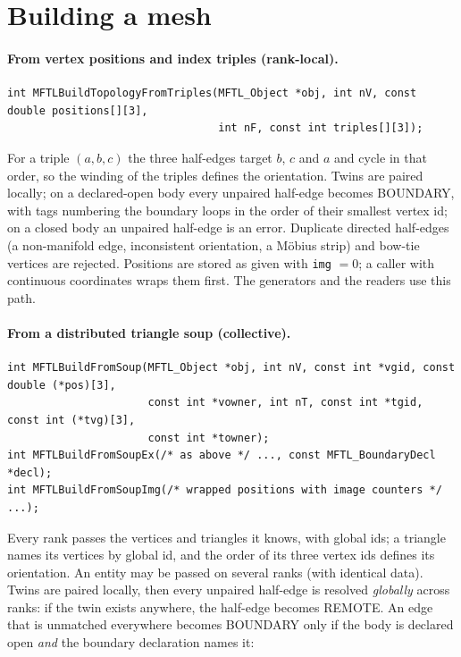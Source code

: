 \section{Building a mesh}

\paragraph{From vertex positions and index triples (rank-local).}\mbox{}
\begin{lstlisting}[numbers=none]
int MFTLBuildTopologyFromTriples(MFTL_Object *obj, int nV, const double positions[][3],
                                 int nF, const int triples[][3]);
\end{lstlisting}
For a triple $(a,b,c)$ the three half-edges target $b$, $c$ and $a$ and cycle in that order, so
the winding of the triples defines the orientation. Twins are paired locally; on a declared-open
body every unpaired half-edge becomes BOUNDARY, with tags numbering the boundary loops in the
order of their smallest vertex id; on a closed body an unpaired half-edge is an error. Duplicate
directed half-edges (a non-manifold edge, inconsistent orientation, a M\"obius strip) and bow-tie
vertices are rejected. Positions are stored as given with \texttt{img} $=0$; a caller with
continuous coordinates wraps them first. The generators and the readers use this path.

\paragraph{From a distributed triangle soup (collective).}\mbox{}
\begin{lstlisting}[numbers=none]
int MFTLBuildFromSoup(MFTL_Object *obj, int nV, const int *vgid, const double (*pos)[3],
                      const int *vowner, int nT, const int *tgid, const int (*tvg)[3],
                      const int *towner);
int MFTLBuildFromSoupEx(/* as above */ ..., const MFTL_BoundaryDecl *decl);
int MFTLBuildFromSoupImg(/* wrapped positions with image counters */ ...);
\end{lstlisting}
Every rank passes the vertices and triangles it knows, with global ids; a triangle names its
vertices by global id, and the order of its three vertex ids defines its orientation. An
entity may be passed on several ranks (with identical data). Twins are paired locally, then
every unpaired half-edge is resolved \emph{globally} across ranks: if the twin exists anywhere,
the half-edge becomes REMOTE. An edge that is unmatched everywhere becomes BOUNDARY only if the
body is declared open \emph{and} the boundary declaration names it:

